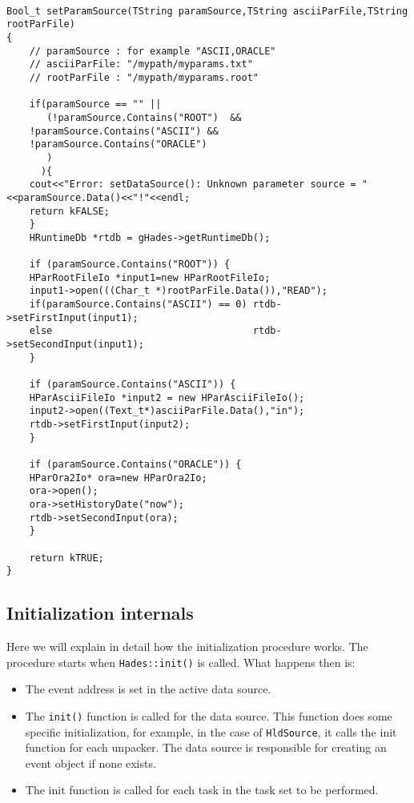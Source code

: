 \begin{lstlisting}

Bool_t setParamSource(TString paramSource,TString asciiParFile,TString rootParFile)
{
    // paramSource : for example "ASCII,ORACLE"
    // asciiParFile: "/mypath/myparams.txt"
    // rootParFile : "/mypath/myparams.root"
    
    if(paramSource == "" ||
       (!paramSource.Contains("ROOT")  &&
	!paramSource.Contains("ASCII") &&
	!paramSource.Contains("ORACLE")
       )
      ){
	cout<<"Error: setDataSource(): Unknown parameter source = "<<paramSource.Data()<<"!"<<endl;
	return kFALSE;
    }
    HRuntimeDb *rtdb = gHades->getRuntimeDb();

    if (paramSource.Contains("ROOT")) {
	HParRootFileIo *input1=new HParRootFileIo;
	input1->open(((Char_t *)rootParFile.Data()),"READ");
	if(paramSource.Contains("ASCII") == 0) rtdb->setFirstInput(input1);
	else                                   rtdb->setSecondInput(input1);
    }

    if (paramSource.Contains("ASCII")) {
	HParAsciiFileIo *input2 = new HParAsciiFileIo();
	input2->open((Text_t*)asciiParFile.Data(),"in");
	rtdb->setFirstInput(input2);
    }

    if (paramSource.Contains("ORACLE")) {
	HParOra2Io* ora=new HParOra2Io;
	ora->open();
	ora->setHistoryDate("now");
	rtdb->setSecondInput(ora);
    }

    return kTRUE;
}
\end{lstlisting} \label{setup_paramsource}


\subsection{Initialization internals}

Here we will explain in detail how the initialization procedure works. The procedure 
starts when \verb+Hades::init()+ is called. What happens then is:
\begin{itemize}
    \item The event address is set in the active data source.
    \item The \verb+init()+ function is called for the data source. This function 
    does some specific initialization, for example, in the case of \verb+HldSource+, 
    it calls the init function for each unpacker. The data source is responsible 
    for creating an event object if none exists.
    \item The init function is called for each task in the task set to be performed. 
\end{itemize}


